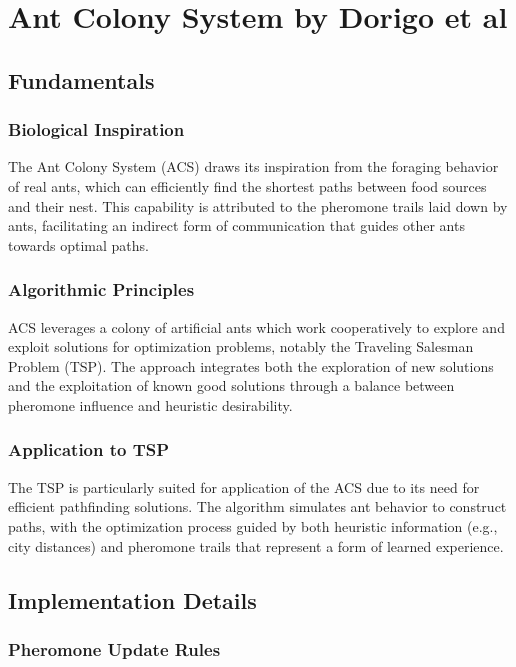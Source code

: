 \chapter{Ant Colony System by Dorigo et al}\label{chapt:5}

\section{Fundamentals}

\subsection{Biological Inspiration}
The Ant Colony System (ACS) draws its inspiration from the foraging behavior of real ants, which can efficiently find the shortest paths between food sources and their nest. This capability is attributed to the pheromone trails laid down by ants, facilitating an indirect form of communication that guides other ants towards optimal paths.


\subsection{Algorithmic Principles}
ACS leverages a colony of artificial ants which work cooperatively to explore and exploit solutions for optimization problems, notably the Traveling Salesman Problem (TSP). The approach integrates both the exploration of new solutions and the exploitation of known good solutions through a balance between pheromone influence and heuristic desirability.

\subsection{Application to TSP}
The TSP is particularly suited for application of the ACS due to its need for efficient pathfinding solutions. The algorithm simulates ant behavior to construct paths, with the optimization process guided by both heuristic information (e.g., city distances) and pheromone trails that represent a form of learned experience.

\section{Implementation Details}


\subsection{Pheromone Update Rules}

